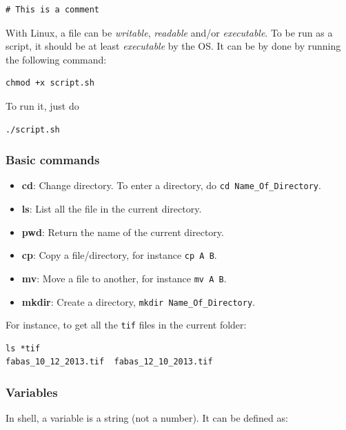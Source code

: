 \documentclass[a4paper,11pt,DIV=18]{scrartcl}
\begin{document}
\begin{verbatim}
# This is a comment
\end{verbatim}
With Linux, a file can be  \emph{writable}, \emph{readable} and/or \emph{executable}. To be
run as a script, it should be at least \emph{executable} by the OS. It can be
by done by running the following command:

\begin{verbatim}
chmod +x script.sh
\end{verbatim}
To run it, just do

\begin{verbatim}
./script.sh
\end{verbatim}

\subsubsection{Basic commands}
\label{sec:orgheadline44}
\begin{itemize}
\item \textbf{cd}: Change directory. To enter a directory, do \texttt{cd Name\_Of\_Directory}.
\item \textbf{ls}: List all the file in the current directory.
\item \textbf{pwd}: Return the name of the current directory.
\item \textbf{cp}: Copy a file/directory, for instance \texttt{cp A B}.
\item \textbf{mv}: Move a file to another, for instance \texttt{mv A B}.
\item \textbf{mkdir}: Create a directory, \texttt{mkdir Name\_Of\_Directory}.
\end{itemize}

For instance, to get all the \texttt{tif} files in the current folder:

\begin{verbatim}
ls *tif
fabas_10_12_2013.tif  fabas_12_10_2013.tif
\end{verbatim}

\subsubsection{Variables}
\label{sec:orgheadline45}
In shell, a variable is a string (not a number). It can be defined as:
\end{document}
